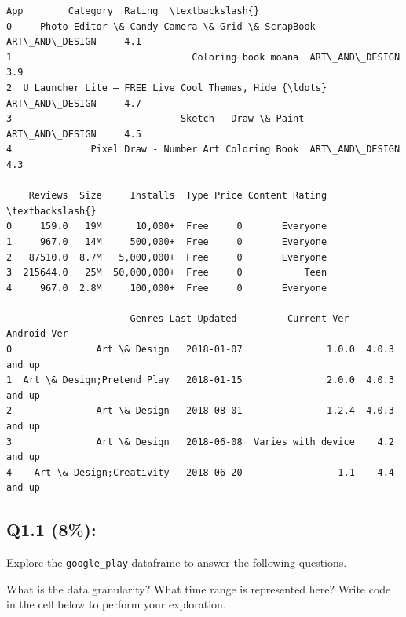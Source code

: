 \documentclass[11pt]{article}
\makeatletter
\newcommand{\boxspacing}{\kern\kvtcb@left@rule\kern\kvtcb@boxsep}
\newcommand{\prompt}[4]{
        {\ttfamily\llap{{\color{#2}[#3]:\hspace{3pt}#4}}\vspace{-\baselineskip}}
    }
\makeatother
\begin{document}
            \begin{tcolorbox}[breakable, size=fbox, boxrule=.5pt, pad at break*=1mm, opacityfill=0]
\prompt{Out}{outcolor}{256}{\boxspacing}
\begin{Verbatim}[commandchars=\\\{\}]
                                                 App        Category  Rating  \textbackslash{}
0     Photo Editor \& Candy Camera \& Grid \& ScrapBook  ART\_AND\_DESIGN     4.1
1                                Coloring book moana  ART\_AND\_DESIGN     3.9
2  U Launcher Lite – FREE Live Cool Themes, Hide {\ldots}  ART\_AND\_DESIGN     4.7
3                              Sketch - Draw \& Paint  ART\_AND\_DESIGN     4.5
4              Pixel Draw - Number Art Coloring Book  ART\_AND\_DESIGN     4.3

    Reviews  Size     Installs  Type Price Content Rating  \textbackslash{}
0     159.0   19M      10,000+  Free     0       Everyone
1     967.0   14M     500,000+  Free     0       Everyone
2   87510.0  8.7M   5,000,000+  Free     0       Everyone
3  215644.0   25M  50,000,000+  Free     0           Teen
4     967.0  2.8M     100,000+  Free     0       Everyone

                      Genres Last Updated         Current Ver   Android Ver
0               Art \& Design   2018-01-07               1.0.0  4.0.3 and up
1  Art \& Design;Pretend Play   2018-01-15               2.0.0  4.0.3 and up
2               Art \& Design   2018-08-01               1.2.4  4.0.3 and up
3               Art \& Design   2018-06-08  Varies with device    4.2 and up
4    Art \& Design;Creativity   2018-06-20                 1.1    4.4 and up
\end{Verbatim}
\end{tcolorbox}
        
    \subsection{Q1.1 (8\%):}\label{q1.1-8}

Explore the \texttt{google\_play} dataframe to answer the following
questions.

What is the data granularity? What time range is represented here? Write
code in the cell below to perform your exploration.
\end{document}
